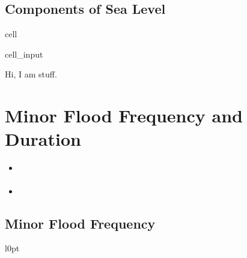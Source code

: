 \documentclass[letterpaper,10pt,english]{jupyterBook}
\begin{document}
\section{Components of Sea Level}
\label{\detokenize{notebooks/regional_and_local/SL_Components_annual:components-of-sea-level}}\label{\detokenize{notebooks/regional_and_local/SL_Components_annual::doc}}
\begin{sphinxuseclass}{cell}\begin{sphinxVerbatimInput}

\begin{sphinxuseclass}{cell_input}
\begin{sphinxVerbatim}[commandchars=\\\{\}]
\end{sphinxVerbatim}

\end{sphinxuseclass}\end{sphinxVerbatimInput}

\end{sphinxuseclass}
\sphinxAtStartPar
Hi, I am stuff.

\sphinxstepscope


\chapter{Minor Flood Frequency and Duration}
\label{\detokenize{notebooks/Flood:minor-flood-frequency-and-duration}}\label{\detokenize{notebooks/Flood::doc}}\begin{itemize}
\item {} 
\sphinxAtStartPar
{\hyperref[\detokenize{notebooks/FloodFrequency::doc}]{}}

\item {} 
\sphinxAtStartPar
{\hyperref[\detokenize{notebooks/FloodDuration::doc}]{}}

\end{itemize}

\sphinxstepscope


\section{Minor Flood Frequency}
\label{\detokenize{notebooks/FloodFrequency:minor-flood-frequency}}\label{\detokenize{notebooks/FloodFrequency::doc}}

\begin{wrapfigure}{l}{0pt}
\centering
\noindent{}
\end{wrapfigure}
\end{document}
